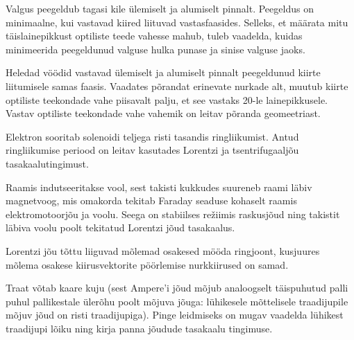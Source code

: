 \documentclass[10pt]{article}
\begin{document}
{%

\hint
Valgus peegeldub tagasi kile ülemiselt ja alumiselt pinnalt. Peegeldus on minimaalne, kui vastavad kiired liituvad vastasfaasides. Selleks, et määrata mitu täislainepikkust optiliste teede vahesse mahub, tuleb vaadelda, kuidas minimeerida peegeldunud valguse hulka punase ja sinise valguse jaoks.
\probend
\bigskip


\hint
Heledad vöödid vastavad ülemiselt ja alumiselt pinnalt peegeldunud kiirte liitumisele samas faasis. Vaadates põrandat erinevate nurkade alt, muutub kiirte optiliste teekondade vahe piisavalt palju, et see vastaks \num{20}-le lainepikkusele. Vastav optiliste teekondade vahe vahemik on leitav põranda geomeetriast.
\probend
\bigskip


\hint
Elektron sooritab solenoidi teljega risti tasandis ringliikumist. Antud ringliikumise periood on leitav kasutades Lorentzi ja tsentrifugaaljõu tasakaalutingimust.
\probend
\bigskip


\hint
Raamis indutseeritakse vool, sest takisti kukkudes suureneb raami läbiv magnetvoog, mis omakorda tekitab Faraday seaduse kohaselt raamis elektromotoorjõu ja voolu. Seega on stabiilses režiimis raskusjõud ning takistit läbiva voolu poolt tekitatud Lorentzi jõud tasakaalus.
\probend
\bigskip


\hint
Lorentzi jõu tõttu liiguvad mõlemad osakesed mööda ringjoont, kusjuures mõlema osakese kiirusvektorite pöörlemise nurkkiirused on samad.
\probend
\bigskip


\hint
Traat võtab kaare kuju (sest Ampere’i jõud mõjub analoogselt täispuhutud palli puhul pallikestale ülerõhu poolt mõjuva jõuga: lühikesele mõttelisele traadijupile mõjuv jõud on risti traadijupiga). Pinge leidmiseks on mugav vaadelda lühikest traadijupi lõiku ning kirja panna jõudude tasakaalu tingimuse.
\probend
\bigskip

}
\end{document}
